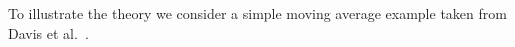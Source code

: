 To illustrate the theory we consider a simple moving average example
taken from Davis et al.~\cite{davis:mikosch:pfaffel:2015}.
\begin{example} \rm
\begin{figure}[htb!]
  \centering
\end{figure}
\end{example}

